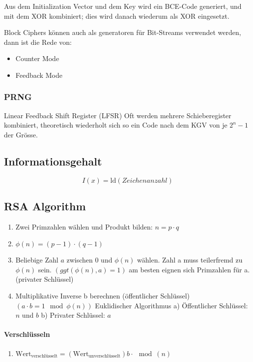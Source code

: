 Aus dem Initialization Vector und dem Key wird ein BCE-Code generiert, und mit dem XOR kombiniert; dies wird danach wiederum als XOR eingesetzt.


Block Ciphers können auch als generatoren für Bit-Streams verwendet werden, dann ist die Rede von:
\begin{itemize}
	\item Counter Mode
	\item Feedback Mode
\end{itemize}

\subsubsection{PRNG}
Linear Feedback Shift Register (LFSR)
Oft werden mehrere Schieberegister kombiniert, theoretisch wiederholt sich so ein Code nach dem KGV von je $2^n-1$ der Grösse.

\subsection{Informationsgehalt}

\[
	I(x) = \mathrm{ld} \left(Zeichenanzahl \right)
\]

\subsection{RSA Algorithm}

\begin{enumerate}
\item Zwei Primzahlen wählen und Produkt bilden: $n = p \cdot q$
\item $\phi(n) = (p - 1) \cdot (q - 1)$
\item Beliebige Zahl $a$ zwischen 0 und $ \phi(n)$ wählen. Zahl a muss teilerfremd zu $\phi(n)$ sein. $(ggt(\phi(n), a) = 1)$ am besten eignen sich Primzahlen für a. (privater Schlüssel)
\item Multiplikative Inverse b berechnen (öffentlicher Schlüssel)$(a \cdot b = 1 \mod \phi (n))$ Euklidischer Algorithmus
a) Öffentlicher Schlüssel: $n$ und $b$
b) Privater Schlüssel: $a$
\end{enumerate}

\paragraph{Verschlüsseln}
\begin{enumerate}
	\item $\text{Wert}_\text{verschlüsselt} = (\text{Wert}_\text{unverschlüsselt}) b \cdot \mod (n)$
\end{enumerate}

